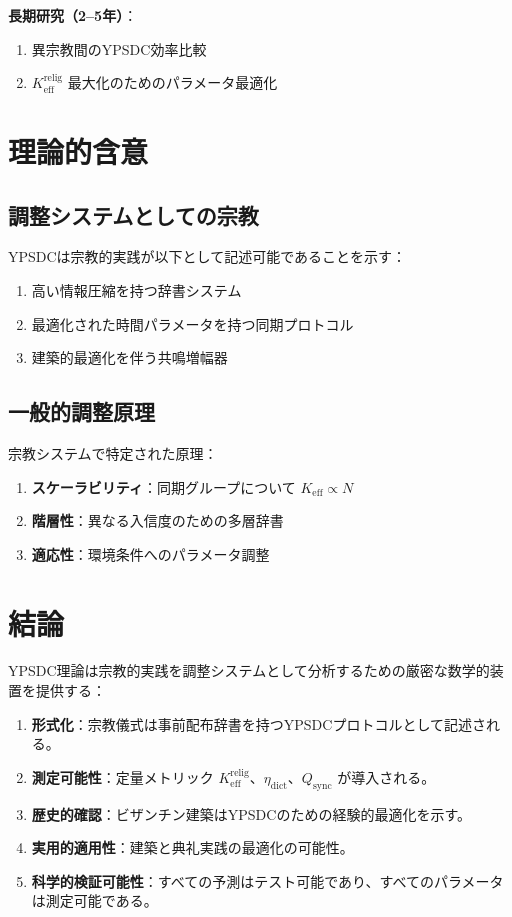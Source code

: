\documentclass[12pt,a4paper]{article}
\begin{document}
	\textbf{長期研究（2–5年）}：
	\begin{enumerate}
		\item 異宗教間のYPSDC効率比較
		\item $K_{\mathrm{eff}}^{\mathrm{relig}}$ 最大化のためのパラメータ最適化
	\end{enumerate}
	
	\section{理論的含意}
	
	\subsection{調整システムとしての宗教}
	
	YPSDCは宗教的実践が以下として記述可能であることを示す：
	\begin{enumerate}
		\item 高い情報圧縮を持つ辞書システム
		\item 最適化された時間パラメータを持つ同期プロトコル
		\item 建築的最適化を伴う共鳴増幅器
	\end{enumerate}
	
	\subsection{一般的調整原理}
	
	宗教システムで特定された原理：
	\begin{enumerate}
		\item \textbf{スケーラビリティ}：同期グループについて $K_{\mathrm{eff}} \propto N$
		\item \textbf{階層性}：異なる入信度のための多層辞書
		\item \textbf{適応性}：環境条件へのパラメータ調整
	\end{enumerate}
	
	\section{結論}
	
	YPSDC理論は宗教的実践を調整システムとして分析するための厳密な数学的装置を提供する：
	
	\begin{enumerate}
		\item \textbf{形式化}：宗教儀式は事前配布辞書を持つYPSDCプロトコルとして記述される。
		\item \textbf{測定可能性}：定量メトリック $K_{\mathrm{eff}}^{\mathrm{relig}}$、$\eta_{\mathrm{dict}}$、$Q_{\mathrm{sync}}$ が導入される。
		\item \textbf{歴史的確認}：ビザンチン建築はYPSDCのための経験的最適化を示す。
		\item \textbf{実用的適用性}：建築と典礼実践の最適化の可能性。
		\item \textbf{科学的検証可能性}：すべての予測はテスト可能であり、すべてのパラメータは測定可能である。
	\end{enumerate}
	
\end{document}
